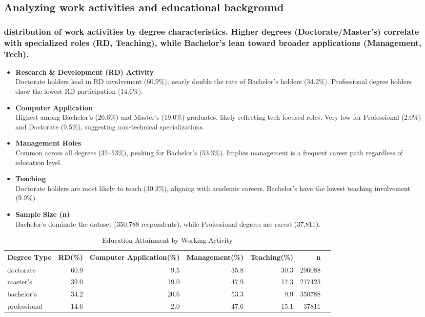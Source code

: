 \documentclass[12pt]{article}
\begin{document}
\subsection {Analyzing work activities and educational background}
\subsubsection{distribution of work activities by degree characteristics. Higher degrees (Doctorate/Master’s) correlate with specialized roles (RD, Teaching), while Bachelor’s lean toward broader applications (Management, Tech). }
\begin{itemize}
    \item \textbf{Research \& Development (RD) Activity} \\
    Doctorate holders lead in RD involvement (60.9\%), nearly double the rate of Bachelor’s holders (34.2\%).
    Professional degree holders show the lowest RD participation (14.6\%).
    \item \textbf{Computer Application} \\
    Highest among Bachelor’s (20.6\%) and Master’s (19.0\%) graduates, likely reflecting tech-focused roles.
    Very low for Professional (2.0\%) and Doctorate (9.5\%), suggesting non-technical specializations.
    \item \textbf{Management Roles} \\
    Common across all degrees (35–53\%), peaking for Bachelor’s (53.3\%).
    Implies management is a frequent career path regardless of education level.
    \item \textbf{Teaching} \\
    Doctorate holders are most likely to teach (30.3\%), aligning with academic careers.
    Bachelor’s have the lowest teaching involvement (9.9\%).
    \item \textbf{Sample Size (n)} \\
    Bachelor’s dominate the dataset (350,788 respondents), while Professional degrees are rarest (37,811).  
\end{itemize}

\begin{table}[ht]
\centering
\begin{tabular}{|l|r|r|r|r|r|r|}
  \toprule
  \hline
Degree Type & RD(\%) & Computer Application(\%) & Management(\%) & Teaching(\%) & n \\ \hline
  \midrule
doctorate & 60.9 & 9.5 & 35.8 & 30.3 & 296088 \\ \hline
  \midrule
master's & 39.0 & 19.0 & 47.9 & 17.3 & 217423 \\ \hline
   \midrule
bachelor's & 34.2 & 20.6 & 53.3 & 9.9 & 350788 \\ \hline
   \midrule
professional & 14.6 & 2.0 & 47.6 & 15.1 & 37811 \\ \hline
   \bottomrule
\end{tabular}
\caption{Education Attainment by Working Activity} 
\label{tab:work_by_field}
\end{table}
\end{document}
